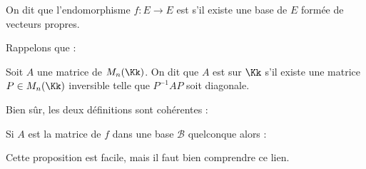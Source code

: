 \documentclass[12pt, class=report,crop=false]{standalone}
\begin{document}
\begin{definition}
On dit que l'endomorphisme $f : E \to E$ est  
s'il existe une base de $E$ formée de vecteurs propres.
\end{definition} 


Rappelons que :
\begin{definition}
Soit $A$ une matrice de $M_n(\Kk)$. On dit que $A$ est  
sur $\Kk$ s'il existe une matrice $P\in M_n(\Kk)$ inversible telle que $P^{-1}AP$ soit diagonale.
\end{definition} 

Bien sûr, les deux définitions sont cohérentes :
\begin{proposition}
Si $A$ est la matrice de $f$ dans une base $\mathcal{B}$ quelconque alors :
\end{proposition}

Cette proposition est facile, mais il faut bien comprendre ce lien.
\end{document}

